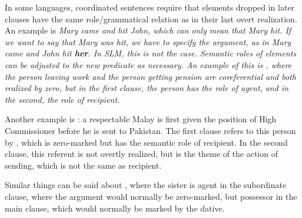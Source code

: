 



In some languages, coordinated sentences require that elements dropped in later clauses have the same role/grammatical relation as in their last overt realization. An example is \em Mary came and hit John\em, which can only mean that Mary hit. If we want to say that Mary was hit, we have to specify the argument, as in \em Mary came and John hit \textbf{her}\em.  In SLM, this is not the case. Semantic roles of elements can be adjusted to the new predicate as necessary. An example of this is , where the person leaving work and the person getting pension are coreferential and both realized by zero, but  in the first clause, the person has the role of agent, and in the second, the role of recipient.



Another example is : a respectable Malay is first given the position of High Commissioner before he is sent to Pakistan. The first clause refers to this person by , which is zero-marked but has the semantic role of recipient. In the second clause, this referent is not overtly realized, but is the theme of the action of sending, which is not the same as recipient.


Similar things can be said about , where the sister is agent in the subordinate clause, where the argument would normally be zero-marked, but possessor in the main clause, which would normally be marked by the dative.

